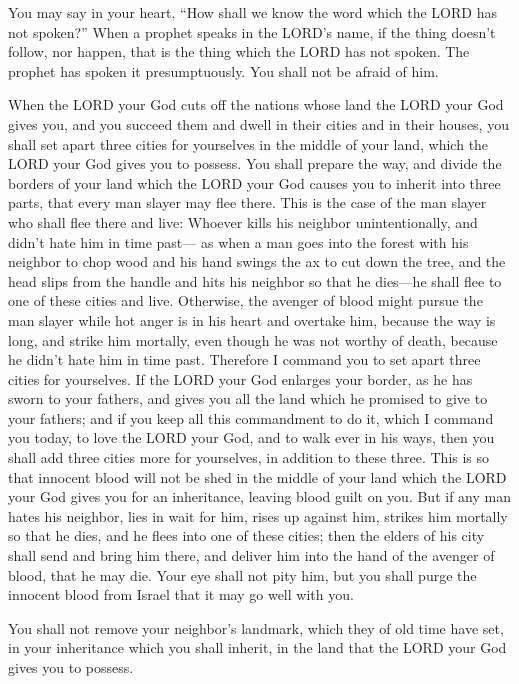 \myverse{}You may say in your heart, “How shall we know the word which
the LORD has not spoken?”
\myverse{}When a prophet speaks in the LORD’s name, if the thing doesn’t follow, nor
happen, that is the thing which the LORD has not spoken. The prophet has spoken it presumptuously. You
shall not be afraid of him.


\mychapter{} \myverse*{}When the LORD your God cuts off the nations whose land the LORD
your God gives you, and you succeed them and dwell in their cities and in their houses,
\myverse{}you shall set apart three cities for yourselves in the middle of your land,
which the LORD your God gives you to possess.
\myverse{}You shall prepare the way, and divide the borders of your land which the LORD
your God causes you to inherit into three parts, that every man slayer may flee there.
\myverse{}This is the case of the man slayer who shall flee there and live: Whoever kills
his neighbor unintentionally, and didn’t hate him in time past—
\myverse{}as when a man goes into the forest with his neighbor to chop wood and his hand
swings the ax to cut down the tree, and the head slips from the handle and hits his neighbor so that he
dies—he shall flee to one of these cities and live.
\myverse{}Otherwise, the avenger of blood might pursue the man slayer while hot anger
is in his heart and overtake him, because the way is long, and strike him mortally, even though he was
not worthy of death, because he didn’t hate him in time past.
\myverse{}Therefore I command you to set apart three cities for yourselves.
\myverse{}If the LORD your God enlarges your border, as he has sworn to your fathers,
and gives you all the land which he promised to give to your fathers;
\myverse{}and if you keep all this commandment to do it, which I command you today, to
love the LORD your God, and to walk ever in his ways, then you shall add three cities more for yourselves,
in addition to these three.
\myverse{}This is so that innocent blood will not be shed in the middle of your land
which the LORD your God gives you for an inheritance, leaving blood guilt on you.
\myverse{}But if any man hates his neighbor, lies in wait for him, rises up against
him, strikes him mortally so that he dies, and he flees into one of these cities;
\myverse{}then the elders of his city shall send and bring him there, and deliver him
into the hand of the avenger of blood, that he may die.
\myverse{}Your eye shall not pity him, but you shall purge the innocent blood from
Israel that it may go well with you.


\myverse{}You shall not remove your neighbor’s landmark, which they of
old time have set, in your inheritance which you shall inherit, in the land that the LORD your God gives
you to possess.


